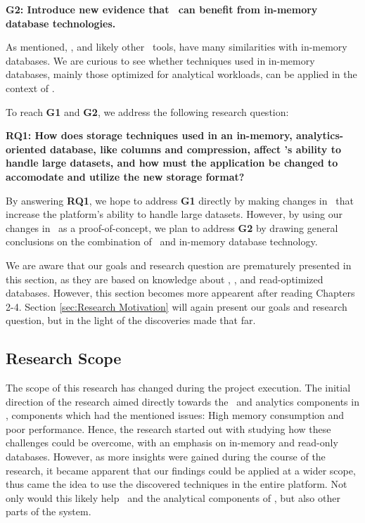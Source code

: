 \setlength{\leftskip}{1cm}

\textbf{G2: Introduce new evidence that \mde~can benefit from in-memory database technologies.}

\setlength{\leftskip}{0pt}

As mentioned, \gap, and likely other \mde~tools, have many similarities with in-memory databases. We are curious to see whether techniques used in in-memory databases, mainly those optimized for analytical workloads, can be applied in the context of \mde. 

To reach \textbf{G1} and \textbf{G2}, we address the following research question:

\setlength{\leftskip}{1cm}

\textbf{RQ1: How does storage techniques used in an in-memory, analytics-oriented database, like columns and compression, affect \gap's ability to handle large datasets, and how must the application be changed to accomodate and utilize the new storage format?} 

\setlength{\leftskip}{0pt}

By answering \textbf{RQ1}, we hope to address \textbf{G1} directly by making changes in \gap~that increase the platform's ability to handle large datasets. However, by using our changes in \gap~as a proof-of-concept, we plan to address \textbf{G2} by drawing general conclusions on the combination of \mde~and in-memory database technology.

We are aware that our goals and research question are prematurely presented in this section, as they are based on knowledge about \mde, \gap, and read-optimized databases. However, this section becomes more appearent after reading Chapters 2-4. Section \ref{sec:Research Motivation} will again present our goals and research question, but in the light of the discoveries made that far. 

\subsection{Research Scope}
\label{sub:Research Scope}
The scope of this research has changed during the project execution. The initial direction of the research aimed directly towards the \bi~and analytics components in \gap, components which had the mentioned issues: High memory consumption and poor performance. Hence, the research started out with studying how these challenges could be overcome, with an emphasis on in-memory and read-only databases. However, as more insights were gained during the course of the research, it became apparent that our findings could be applied at a wider scope, thus came the idea to use the discovered techniques in the entire platform. Not only would this likely help \bi~and the analytical components of \gap, but also other parts of the system.

